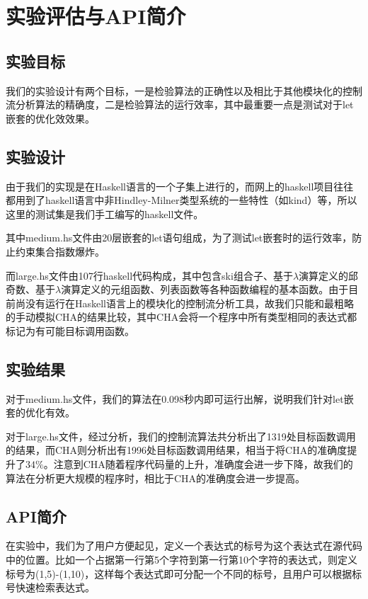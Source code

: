 \documentclass[UTF8, colorlinks]{pkuthss}
\begin{document}
	\chapter{实验评估与API简介}
	\section{实验目标}
	我们的实验设计有两个目标，一是检验算法的正确性以及相比于其他模块化的控制流分析算法的精确度，二是检验算法的运行效率，其中最重要一点是测试对于let嵌套的优化效效果。
	\section{实验设计}
	由于我们的实现是在Haskell语言的一个子集上进行的，而网上的haskell项目往往都用到了haskell语言中非Hindley-Milner类型系统的一些特性（如kind）等，所以这里的测试集是我们手工编写的haskell文件。
	
	其中medium.hs文件由20层嵌套的let语句组成，为了测试let嵌套时的运行效率，防止约束集合指数爆炸。
	
	而large.hs文件由107行haskell代码构成，其中包含ski组合子、基于$\lambda$演算定义的邱奇数、基于$\lambda$演算定义的元组函数、列表函数等各种函数编程的基本函数。由于目前尚没有运行在Haskell语言上的模块化的控制流分析工具，故我们只能和最粗略的手动模拟CHA的结果比较，其中CHA会将一个程序中所有类型相同的表达式都标记为有可能目标调用函数。 
	
	\section{实验结果}
	对于medium.hs文件，我们的算法在0.098秒内即可运行出解，说明我们针对let嵌套的优化有效。

	对于large.hs文件，经过分析，我们的控制流算法共分析出了1319处目标函数调用的结果，而CHA则分析出有1996处目标函数调用结果，相当于将CHA的准确度提升了$34\%$。注意到CHA随着程序代码量的上升，准确度会进一步下降，故我们的算法在分析更大规模的程序时，相比于CHA的准确度会进一步提高。
	
	\section{API简介}
	在实验中，我们为了用户方便起见，定义一个表达式的标号为这个表达式在源代码中的位置。比如一个占据第一行第5个字符到第一行第10个字符的表达式，则定义标号为(1,5)-(1,10)，这样每个表达式即可分配一个不同的标号，且用户可以根据标号快速检索表达式。
	
\end{document}
